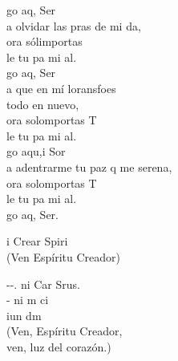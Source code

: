 \documentclass[12pt]{article}
\begin{document}
\begin{multicols*}{2}
\begin{cancion}%
	go aq,  Ser \\
	a olvidar las pras de mi da,\\
	ora sólimportas \\
	le tu pa mi al.\\
\jump
	go aq,  Ser \\
	a que en mí loransfoes \\
todo en nuevo,\\
	ora solomportas T\\
	le tu pa mi al.\\
\jump
	go aqu,i Sor\\
	a adentrarme  tu paz q me serena,\\
	ora solomportas T\\
	le tu pa mi al.\\
\jump
	go aq,  Ser. \\
\end{cancion}%

\begin{cancion}%
	i Crear Spiri \\
(Ven Espíritu Creador)\\
\end{cancion}%

\begin{cancion}%
	--. ni Car Srus.\\
	 - ni m ci\\
	iun dm\\
(Ven, Espíritu Creador,\\
 ven, luz del corazón.)\\
\end{cancion}%


\end{multicols*}
\end{document}

